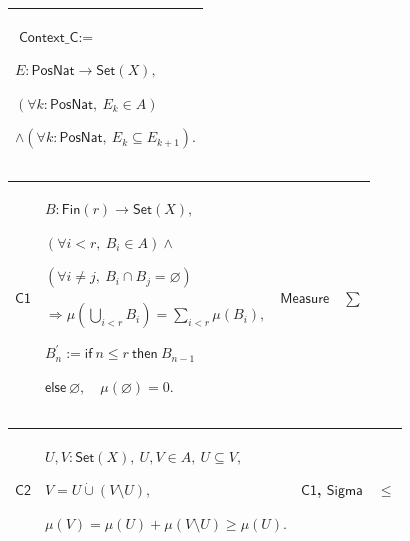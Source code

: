 \documentclass[11pt]{amsart}
\newlength{\FTCOneColumnBody}
\newlength{\FTCFourColumnBody}
\begin{document}
{\par\setlength{\parskip}{0pt}\nointerlineskip
\noindent
\begin{tabular}{|@{}>{\centering\arraybackslash}m{\FTCOneColumnBody}|}\hline
$\displaystyle \textsf{Context\_C}:=$\par
$\displaystyle E:\textsf{PosNat}\to\textsf{Set}(X),$\par
$\displaystyle (\forall k:\textsf{PosNat},\ E_k\in A)$\par
$\displaystyle \land(\forall k:\textsf{PosNat},\ E_k\subseteq E_{k+1}).$\\ \hline
\end{tabular}%
\par\setlength{\parskip}{0pt}\nointerlineskip
\noindent
\begin{tabular}{|@{}>{\centering\arraybackslash}m{0.078431\FTCFourColumnBody}|>{\centering\arraybackslash}m{0.535947\FTCFourColumnBody}|>{\centering\arraybackslash}m{0.281045\FTCFourColumnBody}|>{\centering\arraybackslash}m{0.104575\FTCFourColumnBody}|}\hline
\hypertarget{proof:C1}{$\displaystyle \textsf{C1}$} & $\displaystyle B:\textsf{Fin}(r)\to\textsf{Set}(X),$\par
$\displaystyle (\forall i<r,\ B_i\in A)\land$\par
$\displaystyle (\forall i\ne j,\ B_i\cap B_j=\varnothing)$\par
$\displaystyle \Rightarrow\mu(\bigcup_{i<r}B_i)=\sum_{i<r}\mu(B_i),$\par
$\displaystyle B_n^\prime:=\textsf{if}\ n\le r\ \textsf{then}\ B_{n-1}$\par
$\displaystyle \textsf{else}\ \varnothing,\quad\mu(\varnothing)=0.$ & \hyperlink{ax:Measure}{$\displaystyle \textsf{Measure}$} & $\displaystyle \sum$\\ \hline
\end{tabular}%
\par\setlength{\parskip}{0pt}\nointerlineskip
\noindent
\begin{tabular}{|@{}>{\centering\arraybackslash}m{0.078431\FTCFourColumnBody}|>{\centering\arraybackslash}m{0.535947\FTCFourColumnBody}|>{\centering\arraybackslash}m{0.281045\FTCFourColumnBody}|>{\centering\arraybackslash}m{0.104575\FTCFourColumnBody}|}\hline
\hypertarget{proof:C2}{$\displaystyle \textsf{C2}$} & $\displaystyle U,V:\textsf{Set}(X),\ U,V\in A,\ U\subseteq V,$\par
$\displaystyle V=U\mathbin{\dot\cup}(V\setminus U),$\par
$\displaystyle \mu(V)=\mu(U)+\mu(V\setminus U)\ge\mu(U).$ & \hyperlink{proof:C1}{$\displaystyle \textsf{C1}$}, \hyperlink{ax:Sigma}{$\displaystyle \textsf{Sigma}$} & $\displaystyle \le$\\ \hline

\end{tabular}}
\end{document}
